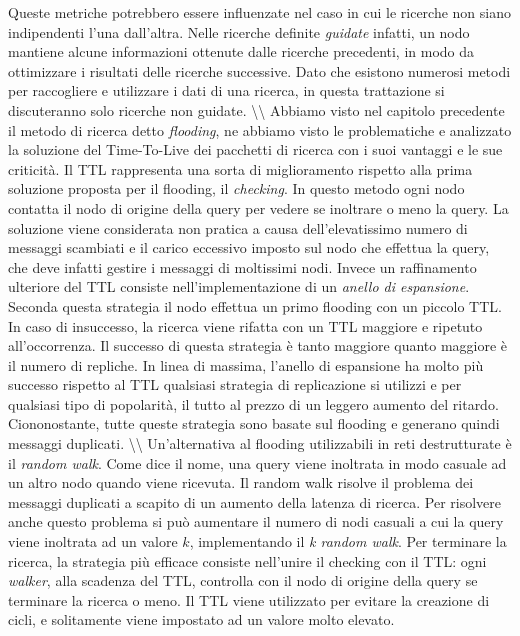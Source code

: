 Queste metriche potrebbero essere influenzate nel caso in cui le
ricerche non siano indipendenti l'una dall'altra. Nelle ricerche
definite \emph{guidate} infatti, un nodo mantiene alcune informazioni
ottenute dalle ricerche precedenti, in modo da ottimizzare i risultati
delle ricerche successive. Dato che esistono numerosi metodi per
raccogliere e utilizzare i dati di una ricerca, in questa trattazione si
discuteranno solo ricerche non guidate. \textbackslash{}\textbackslash{}
Abbiamo visto nel capitolo precedente il metodo di ricerca detto
\emph{flooding}, ne abbiamo visto le problematiche e analizzato la
soluzione del Time-To-Live dei pacchetti di ricerca con i suoi vantaggi
e le sue criticità. Il TTL rappresenta una sorta di miglioramento
rispetto alla prima soluzione proposta per il flooding, il
\emph{checking}. In questo metodo ogni nodo contatta il nodo di origine
della query per vedere se inoltrare o meno la query. La soluzione viene
considerata non pratica a causa dell'elevatissimo numero di messaggi
scambiati e il carico eccessivo imposto sul nodo che effettua la query,
che deve infatti gestire i messaggi di moltissimi nodi. Invece un
raffinamento ulteriore del TTL consiste nell'implementazione di un
\emph{anello di espansione}. Seconda questa strategia il nodo effettua
un primo flooding con un piccolo TTL. In caso di insuccesso, la ricerca
viene rifatta con un TTL maggiore e ripetuto all'occorrenza. Il successo
di questa strategia è tanto maggiore quanto maggiore è il numero di
repliche. In linea di massima, l'anello di espansione ha molto più
successo rispetto al TTL qualsiasi strategia di replicazione si utilizzi
e per qualsiasi tipo di popolarità, il tutto al prezzo di un leggero
aumento del ritardo. Ciononostante, tutte queste strategia sono basate
sul flooding e generano quindi messaggi duplicati.
\textbackslash{}\textbackslash{} Un'alternativa al flooding utilizzabili
in reti destrutturate è il \emph{random walk}. Come dice il nome, una
query viene inoltrata in modo casuale ad un altro nodo quando viene
ricevuta. Il random walk risolve il problema dei messaggi duplicati a
scapito di un aumento della latenza di ricerca. Per risolvere anche
questo problema si può aumentare il numero di nodi casuali a cui la
query viene inoltrata ad un valore $k$, implementando il \emph{k random
walk}. Per terminare la ricerca, la strategia più efficace consiste
nell'unire il checking con il TTL: ogni \emph{walker}, alla scadenza del
TTL, controlla con il nodo di origine della query se terminare la
ricerca o meno. Il TTL viene utilizzato per evitare la creazione di
cicli, e solitamente viene impostato ad un valore molto elevato.

